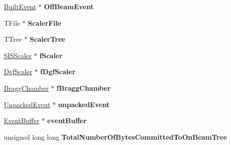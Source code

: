 \begin{DoxyCompactItemize}
\item 
\hypertarget{class_event_builder_a33fa364106a147d69464ed801914c039}{\hyperlink{class_built_event}{Built\-Event} $\ast$ {\bfseries Off\-Beam\-Event}}\label{class_event_builder_a33fa364106a147d69464ed801914c039}

\item 
\hypertarget{class_event_builder_a36e61d6ae0a5ca12a187a9f93b7caa35}{T\-File $\ast$ {\bfseries Scaler\-File}}\label{class_event_builder_a36e61d6ae0a5ca12a187a9f93b7caa35}

\item 
\hypertarget{class_event_builder_a86f40c1de009f240484f360b4b1f00fb}{T\-Tree $\ast$ {\bfseries Scaler\-Tree}}\label{class_event_builder_a86f40c1de009f240484f360b4b1f00fb}

\item 
\hypertarget{class_event_builder_adf3ff93f7ca3327bc0af28de591033fd}{\hyperlink{class_s_i_s_scaler}{S\-I\-S\-Scaler} $\ast$ {\bfseries f\-Scaler}}\label{class_event_builder_adf3ff93f7ca3327bc0af28de591033fd}

\item 
\hypertarget{class_event_builder_aff1dc4c9b45e08a24ae7c2494ebe7d21}{\hyperlink{class_dgf_scaler}{Dgf\-Scaler} $\ast$ {\bfseries f\-Dgf\-Scaler}}\label{class_event_builder_aff1dc4c9b45e08a24ae7c2494ebe7d21}

\item 
\hypertarget{class_event_builder_af867c2663537a310fae772bce880e94e}{\hyperlink{class_bragg_chamber}{Bragg\-Chamber} $\ast$ {\bfseries f\-Bragg\-Chamber}}\label{class_event_builder_af867c2663537a310fae772bce880e94e}

\item 
\hypertarget{class_event_builder_a6287491909eb804907a418595242bbda}{\hyperlink{class_unpacked_event}{Unpacked\-Event} $\ast$ {\bfseries unpacked\-Event}}\label{class_event_builder_a6287491909eb804907a418595242bbda}

\item 
\hypertarget{class_event_builder_aaaeb73c068c80c7722e8acd58beaa98a}{\hyperlink{class_event_buffer}{Event\-Buffer} $\ast$ {\bfseries event\-Buffer}}\label{class_event_builder_aaaeb73c068c80c7722e8acd58beaa98a}

\item 
\hypertarget{class_event_builder_aa39b1750bd0210932370aa42c2415edc}{unsigned long long {\bfseries Total\-Number\-Of\-Bytes\-Committed\-To\-On\-Beam\-Tree}}\label{class_event_builder_aa39b1750bd0210932370aa42c2415edc}


\end{DoxyCompactItemize}
